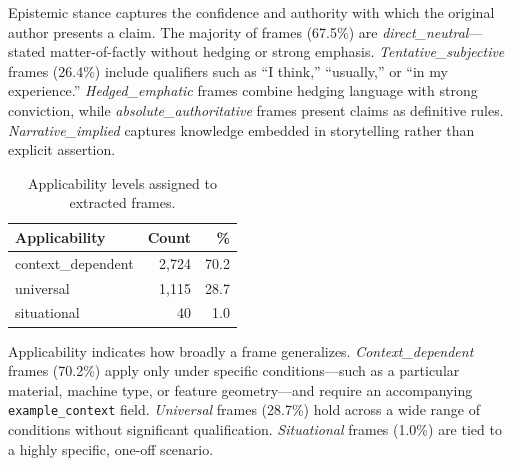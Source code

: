 Epistemic stance captures the confidence and authority with which the
original author presents a claim.  The majority of frames (67.5\%)
are \emph{direct\_neutral}---stated matter-of-factly without hedging
or strong emphasis.  \emph{Tentative\_subjective} frames (26.4\%)
include qualifiers such as ``I think,'' ``usually,'' or ``in my
experience.''  \emph{Hedged\_emphatic} frames combine hedging
language with strong conviction, while
\emph{absolute\_authoritative} frames present claims as definitive
rules.  \emph{Narrative\_implied} captures knowledge embedded in
storytelling rather than explicit assertion.


\begin{table}[t]
\caption{Applicability levels assigned to extracted frames.}
\label{tab:applicability-dist}
\centering
\begin{tabular}{lrr}
\toprule
Applicability & Count & \% \\
\midrule
context\_dependent & 2{,}724 & 70.2 \\
universal          & 1{,}115 & 28.7 \\
situational        &    40  &  1.0 \\
\bottomrule
\end{tabular}
\end{table}

Applicability indicates how broadly a frame generalizes.
\emph{Context\_dependent} frames (70.2\%) apply only under specific
conditions---such as a particular material, machine type, or feature
geometry---and require an accompanying \texttt{example\_context}
field.  \emph{Universal} frames (28.7\%) hold across a wide range of
conditions without significant qualification.
\emph{Situational} frames (1.0\%) are tied to a highly specific,
one-off scenario.


